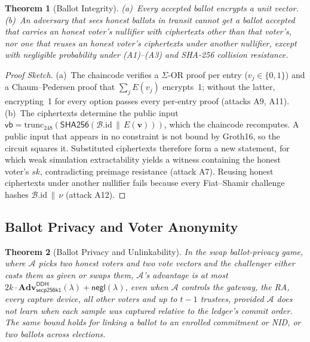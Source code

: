 \documentclass[10pt,letterpaper,journal]{IEEEtran}
\newtheorem{theorem}{Theorem}[section]
\begin{document}
\begin{theorem}[Ballot Integrity]
\label{thm:integrity}
(a)~Every accepted ballot encrypts a unit vector. (b)~An adversary that sees honest ballots in transit cannot get a ballot accepted that carries an honest voter's nullifier with ciphertexts other than that voter's, nor one that reuses an honest voter's ciphertexts under another nullifier, except with negligible probability under (A1)--(A3) and SHA-256 collision resistance.
\end{theorem}

\begin{proof}[Proof Sketch]
(a)~The chaincode verifies a $\Sigma$-OR proof per entry ($v_j \in \{0,1\}$) and a Chaum--Pedersen proof that $\sum_j E(v_j)$ encrypts~1; without the latter, encrypting~1 for every option passes every per-entry proof (attacks A9, A11). (b)~The ciphertexts determine the public input $\mathsf{vb} = \mathrm{trunc}_{248}(\mathsf{SHA256}(\mathcal{B}.\mathrm{id} \,\|\, E(\mathbf{v})))$, which the chaincode recomputes. A public input that appears in no constraint is not bound by Groth16, so the circuit squares it. Substituted ciphertexts therefore form a new statement, for which weak simulation extractability yields a witness containing the honest voter's $sk$, contradicting preimage resistance (attack A7). Reusing honest ciphertexts under another nullifier fails because every Fiat--Shamir challenge hashes $\mathcal{B}.\mathrm{id} \,\|\, \nu$ (attack A12).
\end{proof}

\subsection{Ballot Privacy and Voter Anonymity}
\label{sec:anonymity}\label{sec:secrecy}

\begin{theorem}[Ballot Privacy and Unlinkability]
\label{thm:anonymity}\label{thm:secrecy}
In the swap ballot-privacy game, where $\mathcal{A}$ picks two honest voters and two vote vectors and the challenger either casts them as given or swaps them, $\mathcal{A}$'s advantage is at most $2k \cdot \mathbf{Adv}^{\mathsf{DDH}}_{\mathsf{secp256k1}}(\lambda) + \mathsf{negl}(\lambda)$, even when $\mathcal{A}$ controls the gateway, the RA, every capture device, all other voters and up to $t-1$ trustees, provided $\mathcal{A}$ does not learn when each sample was captured relative to the ledger's commit order. The same bound holds for linking a ballot to an enrolled commitment or NID, or two ballots across elections.
\end{theorem}
\end{document}
